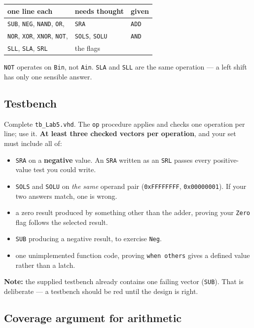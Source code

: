 \documentclass[11pt]{article}
\newcommand{\code}[1]{\texttt{#1}}
\begin{document}
\begin{center}
\begin{tabular}{lll}
\toprule
one line each & needs thought & given \\
\midrule
\code{SUB}, \code{NEG}, \code{NAND}, \code{OR}, & \code{SRA} & \code{ADD} \\
\code{NOR}, \code{XOR}, \code{XNOR}, \code{NOT}, & \code{SOLS}, \code{SOLU} & \code{AND} \\
\code{SLL}, \code{SLA}, \code{SRL} & the flags & \\
\bottomrule
\end{tabular}
\end{center}

\code{NOT} operates on \code{Bin}, not \code{Ain}. \code{SLA} and \code{SLL} are
the same operation --- a left shift has only one sensible answer.

\subsection*{Testbench}

Complete \code{tb\_Lab5.vhd}. The \code{op} procedure applies and checks one
operation per line; use it. \textbf{At least three checked vectors per
operation}, and your set must include all of:

\begin{itemize}[leftmargin=1.4em,itemsep=1pt]
\item \code{SRA} on a \textbf{negative} value. An \code{SRA} written as an
\code{SRL} passes every positive-value test you could write.
\item \code{SOLS} and \code{SOLU} on \emph{the same} operand pair
(\code{0xFFFFFFFF}, \code{0x00000001}). If your two answers match, one is wrong.
\item a zero result produced by something other than the adder, proving your
\code{Zero} flag follows the selected result.
\item \code{SUB} producing a negative result, to exercise \code{Neg}.
\item one unimplemented function code, proving \code{when others} gives a
defined value rather than a latch.
\end{itemize}

\textbf{Note:} the supplied testbench already contains one failing vector
(\code{SUB}). That is deliberate --- a testbench should be red until the design
is right.

\subsection*{Coverage argument for arithmetic}
\end{document}
